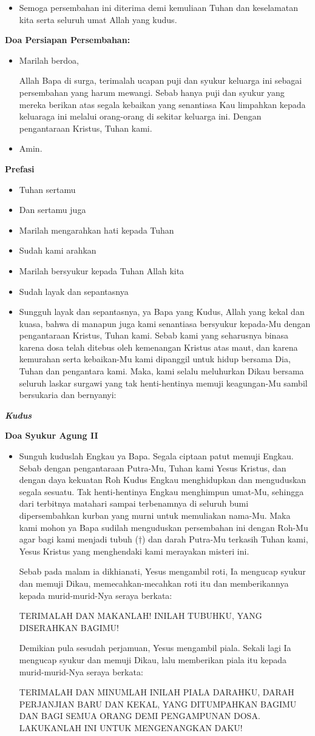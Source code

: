 \documentclass[10pt]{book}
\makeatletter
\newcommand{\subjudul}[1]{%
  {\parindent \z@ \normalfont
    \interlinepenalty\@M \bfseries #1\par\nobreak \vskip 20\p@ }}
\newcommand{\lagu}[1]{%
  {\parindent \z@ \normalfont
    \interlinepenalty\@M \bfseries \emph{#1}\par\nobreak \vskip 20\p@ }}
\newcommand{\BU}[1]{\begin{itemize} \item[U:] #1 \end{itemize}}
\newcommand{\BI}[1]{\begin{itemize} \item[I:] #1 \end{itemize}}
\makeatother
\begin{document}
\BU{Semoga persembahan ini diterima demi kemuliaan Tuhan dan keselamatan kita serta seluruh umat Allah yang kudus.}

\subjudul{Doa Persiapan Persembahan:}

\BI{Marilah berdoa,

Allah Bapa di surga, terimalah ucapan puji dan syukur keluarga ini sebagai persembahan yang harum mewangi. Sebab hanya puji dan syukur yang mereka berikan atas segala kebaikan yang senantiasa Kau limpahkan kepada keluaraga ini melalui orang-orang di sekitar keluarga ini. Dengan pengantaraan Kristus, Tuhan kami.}

\BU{Amin.}

\subjudul{Prefasi}

\BI{Tuhan sertamu}
\BU{Dan sertamu juga}
\BI{Marilah mengarahkan hati kepada Tuhan}
\BU{Sudah kami arahkan}
\BI{Marilah bersyukur kepada Tuhan Allah kita}
\BU{Sudah layak dan sepantasnya}
\BI{Sungguh layak dan sepantasnya, ya Bapa yang Kudus, Allah yang kekal dan kuasa, bahwa di manapun juga kami senantiasa bersyukur kepada-Mu dengan pengantaraan Kristus, Tuhan kami. Sebab kami yang seharusnya binasa karena dosa telah ditebus oleh kemenangan Kristus atas maut, dan karena kemurahan serta kebaikan-Mu kami dipanggil untuk hidup bersama Dia, Tuhan dan pengantara kami. Maka, kami selalu meluhurkan Dikau bersama seluruh laskar surgawi yang tak henti-hentinya memuji keagungan-Mu sambil bersukaria dan bernyanyi:}

\lagu{Kudus}

\subjudul{Doa Syukur Agung II}

\BI{Sunguh kuduslah Engkau ya Bapa. Segala ciptaan patut memuji Engkau. Sebab dengan pengantaraan Putra-Mu, Tuhan kami Yesus Kristus, dan dengan daya kekuatan Roh Kudus Engkau menghidupkan dan menguduskan segala sesuatu. Tak henti-hentinya Engkau menghimpun umat-Mu, sehingga dari terbitnya matahari sampai terbenamnya di seluruh bumi dipersembahkan kurban yang murni untuk memuliakan nama-Mu. Maka kami mohon ya Bapa sudilah menguduskan persembahan ini dengan Roh-Mu agar bagi kami menjadi tubuh ($\dagger$) dan darah Putra-Mu terkasih Tuhan kami, Yesus Kristus yang menghendaki kami merayakan misteri ini.

Sebab pada malam ia dikhianati, Yesus mengambil roti, Ia mengucap syukur dan memuji Dikau, memecahkan-mecahkan roti itu dan memberikannya kepada murid-murid-Nya seraya berkata:

TERIMALAH DAN MAKANLAH! INILAH TUBUHKU, YANG DISERAHKAN BAGIMU!

Demikian pula sesudah perjamuan, Yesus mengambil piala. Sekali lagi Ia mengucap syukur dan memuji Dikau, lalu memberikan piala itu kepada murid-murid-Nya seraya berkata:

TERIMALAH DAN MINUMLAH INILAH PIALA DARAHKU, DARAH PERJANJIAN BARU DAN KEKAL, YANG DITUMPAHKAN BAGIMU DAN BAGI SEMUA ORANG DEMI PENGAMPUNAN DOSA. LAKUKANLAH INI UNTUK MENGENANGKAN DAKU!}
\end{document}
